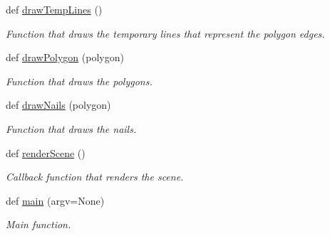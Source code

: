 \begin{DoxyCompactItemize}
\mbox{\label{namespacemain_aa9279d9a799d74c5bf21beff5da0062a}} 
def \hyperlink{namespacemain_aa9279d9a799d74c5bf21beff5da0062a}{draw\+Temp\+Lines} ()
\begin{DoxyCompactList}\small\item\em Function that draws the temporary lines that represent the polygon edges. \end{DoxyCompactList}\item 
def \hyperlink{namespacemain_a923e8cecbed43bf133611a409c40c107}{draw\+Polygon} (polygon)
\begin{DoxyCompactList}\small\item\em Function that draws the polygons. \end{DoxyCompactList}\item 
def \hyperlink{namespacemain_a020b084aad026564a4c7ee5af1ac6b91}{draw\+Nails} (polygon)
\begin{DoxyCompactList}\small\item\em Function that draws the nails. \end{DoxyCompactList}\item 
\mbox{\label{namespacemain_a9258848a9cd7db8568ec88c7846c4768}} 
def \hyperlink{namespacemain_a9258848a9cd7db8568ec88c7846c4768}{render\+Scene} ()
\begin{DoxyCompactList}\small\item\em Callback function that renders the scene. \end{DoxyCompactList}\item 
\mbox{\label{namespacemain_a23a088b39943d6376eeea956b0afbd48}} 
def \hyperlink{namespacemain_a23a088b39943d6376eeea956b0afbd48}{main} (argv=None)
\begin{DoxyCompactList}\small\item\em Main function. \end{DoxyCompactList}\end{DoxyCompactItemize}
